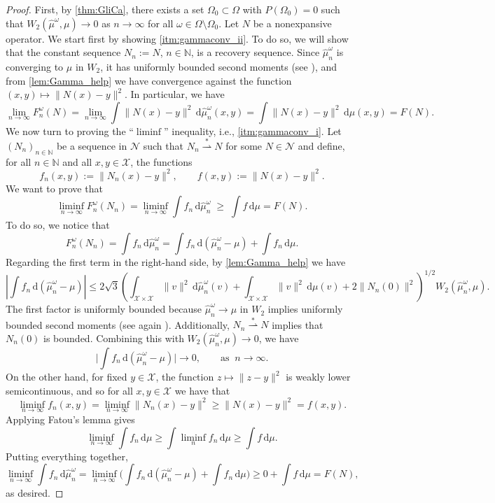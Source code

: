 \documentclass[onefignum,onetabnum]{siamonline250211}
\newcommand{\N}{\mathcal{N}}
\newcommand{\weakk}{\stackrel{\ast}{\rightharpoonup}}
\newcommand{\cX}{\mathcal{X}}
\begin{document}
\begin{proof} First, by \cref{thm:GliCa}, there exists a set $\Omega_0\subset\Omega$ with $P(\Omega_0)=0$ such that $W_2(\hat \mu^{\omega},\mu)\to 0$ as $n\to \infty$ for all $\omega \in \Omega \setminus \Omega_0$. Let $N$ be a nonexpansive operator. We start first by showing \cref{itm:gammaconv_ii}. To do so, we will show that the constant sequence $N_n:=N$, $n\in\mathbb{N}$, is a recovery sequence. Since $\hat \mu^\omega_n $ is converging to $\mu$ in $W_2$, it has uniformly bounded second moments (see \cite[Theorem 6.9]{Villani2009}), and from \cref{lem:Gamma_help} we have convergence against the function $(x,y)\mapsto \|N(x)-y\|^2$. In particular, we have
\[
\lim_{n\to\infty}F_n^\omega(N) =\lim_{n\to\infty} \int \|N(x)-y\|^2 \, \mathrm{d} \hat \mu_n^{\omega}(x,y) = \int \|N(x)-y\|^2 \, \mathrm{d} \mu(x,y)=F(N).
\]
We now turn to proving the ``$\liminf$'' inequality, i.e., \cref{itm:gammaconv_i}. Let $(N_n)_{n\in\mathbb{N}}$ be a sequence in $\N$ such that $N_n\weakk N$ for some $N\in \N$ and define, for all $n\in\mathbb{N}$ and all $x, y\in\cX$, the functions
\[
f_n(x,y):=\|N_n(x)-y\|^2,\qquad f(x,y):=\|N(x)-y\|^2.
\]
We want to prove that
\[
\liminf_{n\to\infty} F_n^\omega(N_n) =\liminf_{n\to\infty}\int f_n\,\mathrm{d}\hat \mu^\omega_n \;\ge\; \int f\,\mathrm{d}\mu = F(N).
\]
To do so, we notice that
\[
F_n^\omega(N_n)=\int f_n\,\mathrm{d}\hat \mu^\omega_n = \int f_n\,\mathrm{d}(\hat \mu^\omega_n-\mu)+\int f_n\,\mathrm{d}\mu.
\]
Regarding the first term in the right-hand side, by \cref{lem:Gamma_help} we have
\[
\left|\int f_n \, \mathrm{d}(\hat \mu^\omega_n-\mu)\right|\leq 2\sqrt{3} \left( \int_{\cX\times \cX} \|v\|^2 \, \mathrm{d}\hat \mu^\omega_n(v) + \int_{\cX\times \cX} \|v\|^2 \, \mathrm{d}\mu(v) + 2\|N_n(0)\|^2\right)^{1/2} W_2(\hat \mu^\omega_n,\mu). 
\]
The first factor is uniformly bounded because $\hat \mu^\omega_n\to\mu$ in $W_2$ implies uniformly bounded second moments (see again \cite[Theorem 6.9]{Villani2009}). Additionally, $N_n\weakk N$ implies that $N_n(0)$ is bounded. Combining this with $W_2(\hat \mu^\omega_n,\mu)\to 0$, we have
\[
\Big|\int f_n\,\mathrm{d}(\hat \mu^\omega_n-\mu)\Big|
\to 0, \qquad \text{as } \ n\to\infty.
\]
On the other hand, for fixed $y\in\cX$, the function $z\mapsto \|z-y\|^2$ is weakly lower semicontinuous, and so for all $x, y\in\cX$ we have that
\[
\liminf_{n\to\infty} f_n(x,y)
=\liminf_{n\to\infty}\|N_n(x)-y\|^2
\ge \|N(x)-y\|^2=f(x,y).
\]
Applying Fatou’s lemma gives
\[
\liminf_{n\to\infty}\int f_n\,\mathrm{d}\mu
\ge \int \liminf_{n} f_n\,\mathrm{d}\mu
\ge \int f\,\mathrm{d}\mu.
\]
Putting everything together,
\[
\liminf_{n\to\infty}\int f_n\,\mathrm{d}\hat \mu^\omega_n
=\liminf_{n\to\infty}\Big(\int f_n\,\mathrm{d}(\hat \mu^\omega_n-\mu)+\int f_n\,\mathrm{d}\mu\Big)
\ge 0 + \int f\,\mathrm{d}\mu
=F(N),
\]
as desired.
\end{proof}
\end{document}
